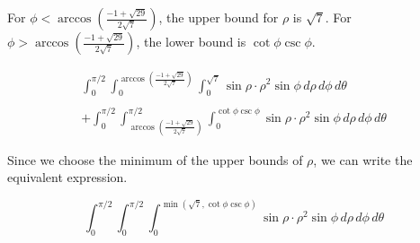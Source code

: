 \documentclass{article}
\begin{document}
\hfill

\noindent For $\displaystyle\phi<\arccos\left(\frac{-1+\sqrt{29}}{2\sqrt7}\right)$, the upper bound for $\rho$ is $\sqrt7$. For $\displaystyle\phi>\arccos\left(\frac{-1+\sqrt{29}}{2\sqrt7}\right)$, the lower bound is $\cot\phi\csc\phi$.

\[\boxed{\begin{array}{l}\displaystyle\int_0^{\pi/2}\int_0^{\arccos\left(\textstyle\frac{-1+\sqrt{29}}{2\sqrt7}\right)}\int_0^{\sqrt7}\sin\rho \cdot\rho^2\sin\phi\,d\rho\,d\phi\,d\theta\\\\\displaystyle+\int_0^{\pi/2}\int_{\arccos\left(\textstyle\frac{-1+\sqrt{29}}{2\sqrt7}\right)}^{\pi/2}\int_0^{\cot\phi\csc\phi}\sin\rho\cdot\rho^2\sin\phi\,d\rho\,d\phi\,d\theta\end{array}}\]

\hfill

\noindent Since we choose the minimum of the upper bounds of $\rho$, we can write the equivalent expression.

\[\boxed{\int_0^{\pi/2}\int_0^{\pi/2}\int_0^{\min\left(\sqrt7,\cot\phi\csc\phi\right)}\sin\rho\cdot\rho^2\sin\phi\,d\rho\,d\phi\,d\theta}\]
\end{document}

